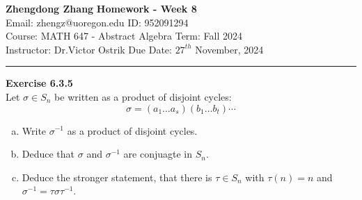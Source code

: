 \documentclass[a4paper, 12pt]{article}
\newenvironment{problem}[2][Exercise]
    { \begin{mdframed}[backgroundcolor=gray!20] \textbf{#1 #2} \\}
    {  \end{mdframed}}
\begin{document}
\noindent
\large\textbf{Zhengdong Zhang} \hfill \textbf{Homework - Week 8}   \\
Email: zhengz@uoregon.edu \hfill ID: 952091294 \\
\normalsize Course: MATH 647 - Abstract Algebra  \hfill Term: Fall 2024\\
Instructor: Dr.Victor Ostrik \hfill Due Date: $27^{th}$ November, 2024 \\
\noindent\rule{7in}{2.8pt}
\begin{problem}{6.3.5}
Let \(\sigma\in S_n\) be written as a product of disjoint cycles:
\[\sigma=(a_1\ldots a_s)(b_1\ldots b_t)\cdots\]
\begin{enumerate}[(a)]
\item Write \(\sigma^{-1}\) as a product of disjoint cycles.
\item Deduce that \(\sigma\) and \(\sigma^{-1}\) are conjuagte in \(S_n\).
\item Deduce the stronger statement, that there is \(\tau\in S_n\) with \(\tau(n)=n\) and \(\sigma^{-1}=\tau\sigma\tau^{-1}\).
\end{enumerate}
\end{problem}
\end{document}
